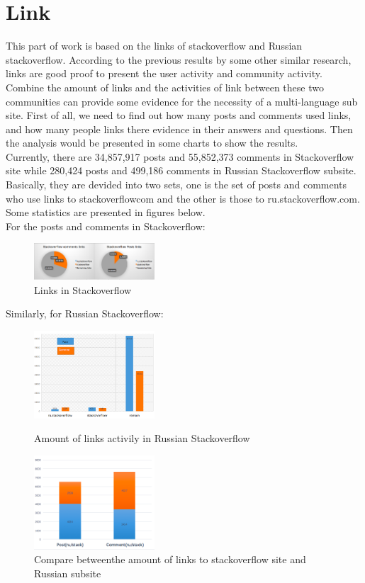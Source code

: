 \documentclass[A4paper,twoside,twocolumn]{article}
\begin{document}
\section{Link}
This part of work is based on the links of stackoverflow and Russian stackoverflow. According to the previous results by some other similar research, links are good proof to present the user activity and community activity. Combine the amount of links and the activities of link between these two communities can provide some evidence for the necessity of a multi-language sub site. First of all, we need to find out how many posts and comments used links, and how many people links there evidence in their answers and questions. Then the analysis would be presented in some charts to show the results. 
\\Currently, there are 34,857,917 posts and 55,852,373 comments in Stackoverflow site while 280,424 posts and 499,186 comments in Russian Stackoverflow subsite. Basically, they are devided into two sets, one is the set of posts and comments who use links to stackoverflowcom and the other is those to ru.stackoverflow.com. Some statistics are presented in figures below.
\\For the posts and comments in Stackoverflow:
	\begin{figure}[H]
		\includegraphics[width = 0.4\textwidth]{link3.png}
		\caption{Links in Stackoverflow}
  	\end{figure}
Similarly, for Russian Stackoverflow:
	\begin{figure}[H]
		\includegraphics[width = 0.4\textwidth]{link1.png}
		\caption{Amount of links activily in Russian Stackoverflow}
		\includegraphics[width = 0.4\textwidth]{link2.png}
		\caption{Compare betweenthe amount of links to stackoverflow site and Russian subsite}
  	\end{figure}
\end{document}
